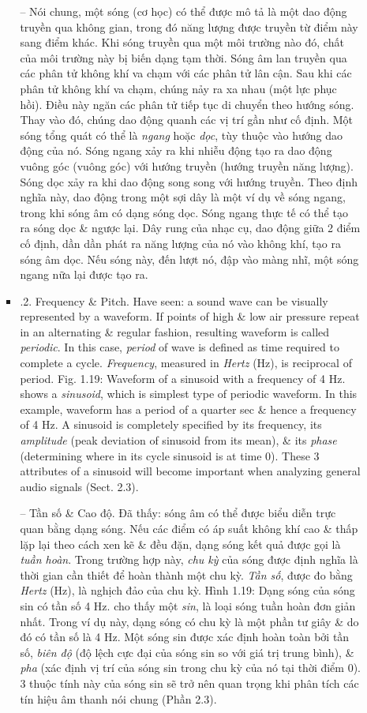 \documentclass{article}
\begin{document}
\begin{itemize}
\begin{itemize}
\begin{itemize}
			-- Nói chung, một sóng {\it} (cơ học) có thể được mô tả là một dao động truyền qua không gian, trong đó năng lượng được truyền từ điểm này sang điểm khác. Khi sóng truyền qua một môi trường nào đó, chất của môi trường này bị biến dạng tạm thời. Sóng âm lan truyền qua các phân tử không khí va chạm với các phân tử lân cận. Sau khi các phân tử không khí va chạm, chúng nảy ra xa nhau (một lực phục hồi). Điều này ngăn các phân tử tiếp tục di chuyển theo hướng sóng. Thay vào đó, chúng dao động quanh các vị trí gần như cố định. Một sóng tổng quát có thể là {\it ngang} hoặc {\it dọc}, tùy thuộc vào hướng dao động của nó. Sóng ngang xảy ra khi nhiễu động tạo ra dao động vuông góc (vuông góc) với hướng truyền (hướng truyền năng lượng). Sóng dọc xảy ra khi dao động song song với hướng truyền. Theo định nghĩa này, dao động trong một sợi dây là một ví dụ về sóng ngang, trong khi sóng âm có dạng sóng dọc. Sóng ngang thực tế có thể tạo ra sóng dọc \& ngược lại. Dây rung của nhạc cụ, dao động giữa 2 điểm cố định, dần dần phát ra năng lượng của nó vào không khí, tạo ra sóng âm dọc. Nếu sóng này, đến lượt nó, đập vào màng nhĩ, một sóng ngang nữa lại được tạo ra.
			\item {.2. Frequency \& Pitch.} Have seen: a sound wave can be visually represented by a waveform. If points of high \& low air pressure repeat in an alternating \& regular fashion, resulting waveform is called {\it periodic}. In this case, {\it period} of wave is defined as time required to complete a cycle. {\it Frequency}, measured in {\it Hertz} (Hz), is reciprocal of period. {\sf Fig. 1.19: Waveform of a sinusoid with a frequency of 4 Hz.} shows a {\it sinusoid}, which is simplest type of periodic waveform. In this example, waveform has a period of a quarter sec \& hence a frequency of 4 Hz. A sinusoid is completely specified by its frequency, its {\it amplitude} (peak deviation of sinusoid from its mean), \& its {\it phase} (determining where in its cycle sinusoid is at time 0). These 3 attributes of a sinusoid will become important when analyzing general audio signals (Sect. 2.3).
			
			-- {\sf Tần số \& Cao độ.} Đã thấy: sóng âm có thể được biểu diễn trực quan bằng dạng sóng. Nếu các điểm có áp suất không khí cao \& thấp lặp lại theo cách xen kẽ \& đều đặn, dạng sóng kết quả được gọi là {\it tuần hoàn}. Trong trường hợp này, {\it chu kỳ} của sóng được định nghĩa là thời gian cần thiết để hoàn thành một chu kỳ. {\it Tần số}, được đo bằng {\it Hertz} (Hz), là nghịch đảo của chu kỳ. {\sf Hình 1.19: Dạng sóng của sóng sin có tần số 4 Hz.} cho thấy một {\it sin}, là loại sóng tuần hoàn đơn giản nhất. Trong ví dụ này, dạng sóng có chu kỳ là một phần tư giây \& do đó có tần số là 4 Hz. Một sóng sin được xác định hoàn toàn bởi tần số, {\it biên độ} (độ lệch cực đại của sóng sin so với giá trị trung bình), \& {\it pha} (xác định vị trí của sóng sin trong chu kỳ của nó tại thời điểm 0). 3 thuộc tính này của sóng sin sẽ trở nên quan trọng khi phân tích các tín hiệu âm thanh nói chung (Phần 2.3).
			

\end{itemize}
\end{itemize}
\end{itemize}
\end{document}
